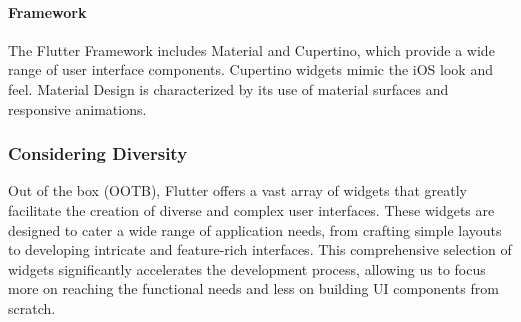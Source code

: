 \paragraph{Framework} The Flutter Framework includes Material and Cupertino, which provide a wide range of user interface 
components. Cupertino widgets mimic the iOS look and feel. Material Design is characterized by its use of material 
surfaces and responsive animations.


\subsubsection{Considering Diversity}

Out of the box (OOTB), Flutter offers a vast array of widgets that greatly facilitate the creation of diverse and 
complex user interfaces. These widgets are designed to cater a wide range of application needs, from crafting simple 
layouts to developing intricate and feature-rich interfaces. This comprehensive selection of widgets significantly 
accelerates the development process, allowing us to focus more on reaching the functional needs and less on building UI 
components from scratch.

